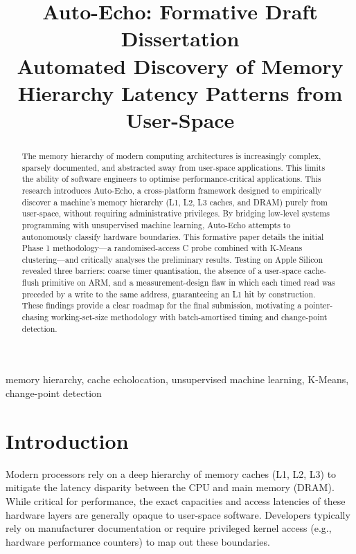 \documentclass[conference]{IEEEtran}
\begin{document}
\title{Auto-Echo: Formative Draft Dissertation\\
{\large Automated Discovery of Memory Hierarchy Latency Patterns from User-Space}
}

\author{
}

\maketitle

\begin{abstract}
The memory hierarchy of modern computing architectures is increasingly complex, sparsely documented, and abstracted away from user-space applications. This limits the ability of software engineers to optimise performance-critical applications. This research introduces Auto-Echo, a cross-platform framework designed to empirically discover a machine's memory hierarchy (L1, L2, L3 caches, and DRAM) purely from user-space, without requiring administrative privileges. By bridging low-level systems programming with unsupervised machine learning, Auto-Echo attempts to autonomously classify hardware boundaries. This formative paper details the initial Phase 1 methodology---a randomised-access C probe combined with K-Means clustering---and critically analyses the preliminary results. Testing on Apple Silicon revealed three barriers: coarse timer quantisation, the absence of a user-space cache-flush primitive on ARM, and a measurement-design flaw in which each timed read was preceded by a write to the same address, guaranteeing an L1 hit by construction. These findings provide a clear roadmap for the final submission, motivating a pointer-chasing working-set-size methodology with batch-amortised timing and change-point detection.
\end{abstract}

\begin{IEEEkeywords}
memory hierarchy, cache echolocation, unsupervised machine learning, K-Means, change-point detection
\end{IEEEkeywords}

\section{Introduction}
Modern processors rely on a deep hierarchy of memory caches (L1, L2, L3) to mitigate the latency disparity between the CPU and main memory (DRAM). While critical for performance, the exact capacities and access latencies of these hardware layers are generally opaque to user-space software. Developers typically rely on manufacturer documentation or require privileged kernel access (e.g., hardware performance counters) to map out these boundaries.
\end{document}
